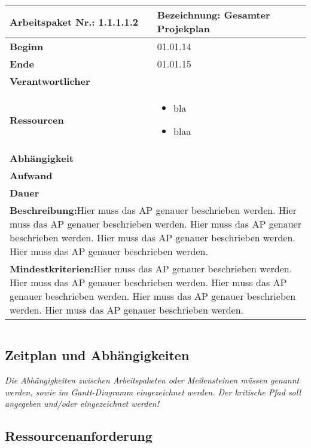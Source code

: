 \documentclass[fontsize=12pt,paper=a4,twoside]{scrartcl}
\begin{document}
 \begin{tabular}{|p{5.3cm}|p{9.7cm}|}\hline
   \textbf{Arbeitspaket Nr.:} 1.1.1.1.2 & \textbf{Bezeichnung:} Gesamter Projekplan\\ \hline \hline
   \textbf{Beginn} & 01.01.14\\ \hline
   \textbf{Ende} & 01.01.15\\ \hline
   \textbf{Verantwortlicher} & \\ \hline
   \textbf{Ressourcen} & \begin{itemize}
   \item bla
   \item blaa
\end{itemize}    \\ \hline
\textbf{Abhängigkeit} &\\ \hline
 \textbf{Aufwand} & \\ \hline
 \textbf{Dauer} & \\ \hline
   \multicolumn{2}{|p{15cm}|}{\textbf{Beschreibung:}\newline  Hier muss das AP genauer beschrieben werden. Hier muss das AP genauer beschrieben werden. Hier muss das AP genauer beschrieben werden. Hier muss das AP genauer beschrieben werden. Hier muss das AP genauer beschrieben werden. }\\ \hline
    \multicolumn{2}{|p{15cm}|}{\textbf{Mindestkriterien:}\newline  Hier muss das AP genauer beschrieben werden. Hier muss das AP genauer beschrieben werden. Hier muss das AP genauer beschrieben werden. Hier muss das AP genauer beschrieben werden. Hier muss das AP genauer beschrieben werden. }\\ \hline
 \end{tabular}
 \begin{verbatim}
 \end{verbatim}
 
\subsection{Zeitplan und Abhängigkeiten}

{\em Die Abhängigkeiten zwischen Arbeitspaketen oder Meilensteinen müssen genannt werden, sowie im
  Gantt-Diagramm eingezeichnet werden. Der kritische Pfad soll
  angegeben und/oder eingezeichnet werden!}

\subsection{Ressourcenanforderung}
\end{document}
